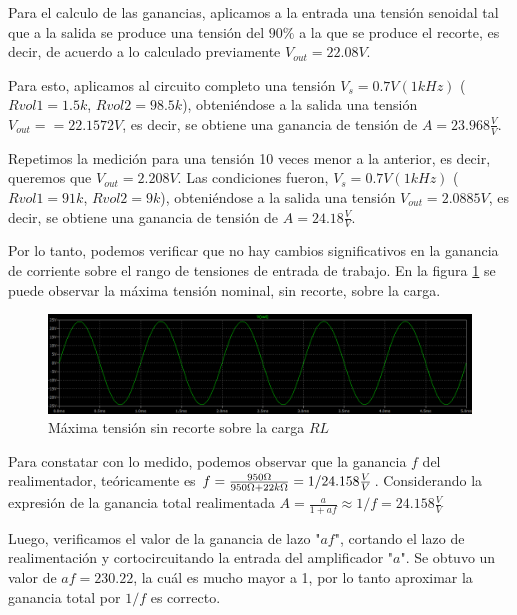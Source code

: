 \par Para el calculo de las ganancias, aplicamos a la entrada una tensión senoidal tal que a la salida se produce una tensión del $90\%$ a la que se produce el recorte, es decir, de acuerdo a lo calculado previamente $V_{out} = 22.08V$.

Para esto, aplicamos al circuito completo una tensión $V_s = 0.7V (1kHz)$ ($Rvol1 = 1.5k$, $Rvol2 = 98.5k$), obteniéndose a la salida una tensión $V_{out}==22.1572V$, es decir, se obtiene una ganancia de tensión de $A = 23.968 \frac{V}{V}$.

Repetimos la medición para una tensión 10 veces menor a la anterior, es decir, queremos que $V_{out} = 2.208V$. Las condiciones fueron, $V_s = 0.7V (1kHz)$ ($Rvol1 = 91k$, $Rvol2 = 9k$), obteniéndose a la salida una tensión $V_{out}= 2.0885V$, es decir, se obtiene una ganancia de tensión de $A = 24.18\frac{V}{V}$.\\

\par Por lo tanto, podemos verificar que no hay cambios significativos en la ganancia de corriente sobre el rango de tensiones de entrada de trabajo. En la figura \ref{fig::Max_tension_sobre_RL} se puede observar la máxima tensión nominal, sin recorte, sobre la carga.

\begin{figure}[H]
        \centering
        \includegraphics[scale=0.5]{./Max_tension_sobre_RL.png}
        \caption{Máxima tensión sin recorte sobre la carga $RL$}
        \label{fig::Max_tension_sobre_RL}
\end{figure}

\par Para constatar con lo medido, podemos observar que la ganancia $f$ del realimentador, teóricamente es $f = \frac{950\ohm}{950\ohm+22k\ohm} = 1/24.158\frac{V}{V}$. Considerando la expresión de la ganancia total realimentada $A = \frac{a}{1+af} \approx 1/f = 24.158\frac{V}{V} $\\

\par Luego, verificamos el valor de la ganancia de lazo "$af$", cortando el lazo de realimentación y cortocircuitando la entrada del amplificador "$a$". Se obtuvo un valor de $af = 230.22$, la cuál es mucho mayor a 1, por lo tanto aproximar la ganancia total por $1/f$ es correcto.

